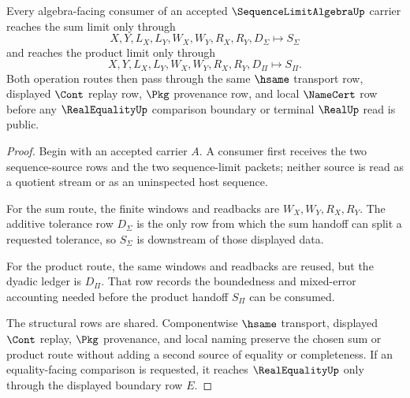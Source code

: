 \begin{theorem}
\label{thm:sequence-limit-algebra-sum-product-handoff}
Every algebra-facing consumer of an accepted $\SequenceLimitAlgebraUp$ carrier reaches the sum limit only through
$$
X,Y,L_X,L_Y,W_X,W_Y,R_X,R_Y,D_{\Sigma}\longmapsto S_{\Sigma}
$$
and reaches the product limit only through
$$
X,Y,L_X,L_Y,W_X,W_Y,R_X,R_Y,D_{\Pi}\longmapsto S_{\Pi}.
$$
Both operation routes then pass through the same $\hsame$ transport row, displayed $\Cont$ replay row, $\Pkg$ provenance row, and local $\NameCert$ row before any $\RealEqualityUp$ comparison boundary or terminal $\RealUp$ read is public.
\end{theorem}
\begin{proof}
Begin with an accepted carrier $A$. A consumer first receives the two sequence-source rows and the two sequence-limit packets; neither source is read as a quotient stream or as an uninspected host sequence.

For the sum route, the finite windows and readbacks are $W_X,W_Y,R_X,R_Y$. The additive tolerance row $D_{\Sigma}$ is the only row from which the sum handoff can split a requested tolerance, so $S_{\Sigma}$ is downstream of those displayed data.

For the product route, the same windows and readbacks are reused, but the dyadic ledger is $D_{\Pi}$. That row records the boundedness and mixed-error accounting needed before the product handoff $S_{\Pi}$ can be consumed.

The structural rows are shared. Componentwise $\hsame$ transport, displayed $\Cont$ replay, $\Pkg$ provenance, and local naming preserve the chosen sum or product route without adding a second source of equality or completeness. If an equality-facing comparison is requested, it reaches $\RealEqualityUp$ only through the displayed boundary row $E$.
\end{proof}



